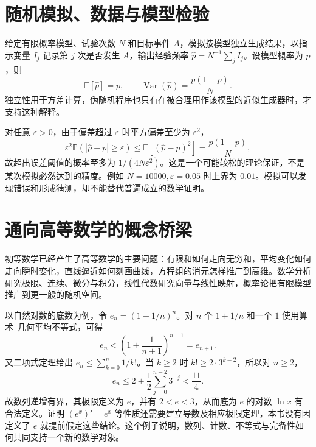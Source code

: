 \section{随机模拟、数据与模型检验}
给定有限概率模型、试验次数 $N$ 和目标事件 $A$，模拟按模型独立生成结果，以指示变量 $I_j$ 记录第 $j$ 次是否发生 $A$，输出经验频率 $\widehat p=N^{-1}\sum_j I_j$。设模型概率为 $p$，则
\[
 \mathbb E[\widehat p]=p,\qquad
 \operatorname{Var}(\widehat p)=\frac{p(1-p)}N.
\]
独立性用于方差计算，伪随机程序也只有在被合理用作该模型的近似生成器时，才支持这种解释。

对任意 $\varepsilon>0$，由于偏差超过 $\varepsilon$ 时平方偏差至少为 $\varepsilon^2$，
\[
 \varepsilon^2\mathbb P(|\widehat p-p|\ge\varepsilon)
 \le\mathbb E[(\widehat p-p)^2]
 =\frac{p(1-p)}N,
\]
故超出误差阈值的概率至多为 $1/(4N\varepsilon^2)$。这是一个可能较松的理论保证，不是某次模拟必然达到的精度。例如 $N=10000,\varepsilon=0.05$ 时上界为 $0.01$。模拟可以发现错误和形成猜测，却不能替代普遍成立的数学证明。

\section{通向高等数学的概念桥梁}
初等数学已经产生了高等数学的主要问题：有限和如何走向无穷和，平均变化如何走向瞬时变化，直线逼近如何刻画曲线，方程组的消元怎样推广到高维。数学分析研究极限、连续、微分与积分，线性代数研究向量与线性映射，概率论把有限模型推广到更一般的随机空间。

以自然对数的底数为例，令 $e_n=(1+1/n)^n$。对 $n$ 个 $1+1/n$ 和一个 $1$ 使用算术--几何平均不等式，可得
\[
 e_n<\left(1+\frac1{n+1}\right)^{n+1}=e_{n+1}.
\]
又二项式定理给出 $e_n\le\sum_{k=0}^n1/k!$。当 $k\ge2$ 时 $k!\ge2\cdot3^{k-2}$，所以对 $n\ge2$，
\[
 e_n\le2+\frac12\sum_{j=0}^{n-2}3^{-j}<\frac{11}4.
\]
故数列递增有界，其极限定义为 $e$，并有 $2<e<3$，从而底为 $e$ 的对数 $\ln x$ 有合法定义。证明 $(e^x)'=e^x$ 等性质还需要建立导数及相应极限定理，本书没有因定义了 $e$ 就提前假定这些结论。这个例子说明，数列、计数、不等式与完备性如何共同支持一个新的数学对象。

